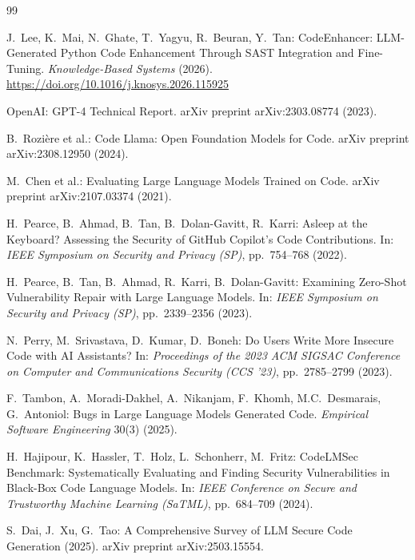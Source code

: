 \documentclass[runningheads]{llncs}
\begin{document}
\begin{thebibliography}{99}

J.\ Lee, K.\ Mai, N.\ Ghate, T.\ Yagyu, R.\ Beuran, Y.\ Tan:
CodeEnhancer: LLM-Generated Python Code Enhancement Through SAST Integration and Fine-Tuning.
\textit{Knowledge-Based Systems} (2026).
\url{https://doi.org/10.1016/j.knosys.2026.115925}

OpenAI:
GPT-4 Technical Report.
arXiv preprint arXiv:2303.08774 (2023).

B.\ Rozière et al.:
Code Llama: Open Foundation Models for Code.
arXiv preprint arXiv:2308.12950 (2024).

M.\ Chen et al.:
Evaluating Large Language Models Trained on Code.
arXiv preprint arXiv:2107.03374 (2021).

H.\ Pearce, B.\ Ahmad, B.\ Tan, B.\ Dolan-Gavitt, R.\ Karri:
Asleep at the Keyboard? Assessing the Security of GitHub Copilot's Code Contributions.
In: \textit{IEEE Symposium on Security and Privacy (SP)}, pp.\ 754--768 (2022).

H.\ Pearce, B.\ Tan, B.\ Ahmad, R.\ Karri, B.\ Dolan-Gavitt:
Examining Zero-Shot Vulnerability Repair with Large Language Models.
In: \textit{IEEE Symposium on Security and Privacy (SP)}, pp.\ 2339--2356 (2023).

N.\ Perry, M.\ Srivastava, D.\ Kumar, D.\ Boneh:
Do Users Write More Insecure Code with AI Assistants?
In: \textit{Proceedings of the 2023 ACM SIGSAC Conference on Computer and Communications Security (CCS '23)}, pp.\ 2785--2799 (2023).

F.\ Tambon, A.\ Moradi-Dakhel, A.\ Nikanjam, F.\ Khomh, M.C.\ Desmarais, G.\ Antoniol:
Bugs in Large Language Models Generated Code.
\textit{Empirical Software Engineering} 30(3) (2025).

H.\ Hajipour, K.\ Hassler, T.\ Holz, L.\ Schonherr, M.\ Fritz:
CodeLMSec Benchmark: Systematically Evaluating and Finding Security Vulnerabilities in Black-Box Code Language Models.
In: \textit{IEEE Conference on Secure and Trustworthy Machine Learning (SaTML)}, pp.\ 684--709 (2024).

S.\ Dai, J.\ Xu, G.\ Tao:
A Comprehensive Survey of LLM Secure Code Generation (2025).
arXiv preprint arXiv:2503.15554.


\end{thebibliography}
\end{document}
